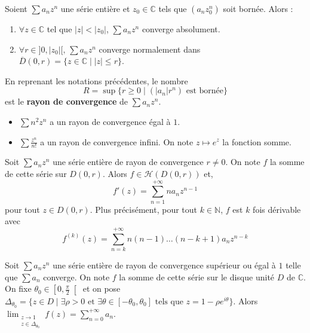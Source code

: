   \begin{lemma}
    Soient $\sum a_n z^n$ une série entière et $z_0 \in \mathbb{C}$ tels que $(a_n z_0^n)$ soit bornée. Alors :
    \begin{enumerate}[label={\bfseries(\roman*)}]
      \item $\forall z \in \mathbb{C}$ tel que $|z| < |z_0|$, $\sum a_n z^n$ converge absolument.
      \item $\forall r \in ]0,|z_0|[, \, \sum a_n z^n$ converge normalement dans $\overline{D}(0, r) = \{ z \in \mathbb{C} \mid |z| \leq r \}$.
    \end{enumerate}
  \end{lemma}

  \begin{definition}
    En reprenant les notations précédentes, le nombre
    \[ R = \sup \{ r \geq 0 \mid (|a_n|r^n) \text{ est bornée} \} \]
    est le \textbf{rayon de convergence} de $\sum a_n z^n$.
  \end{definition}


  \begin{example}
    \begin{itemize}
      \item $\sum n^2 z^n$ a un rayon de convergence égal à $1$.
      \item $\sum \frac{z^n}{n!}$ a un rayon de convergence infini. On note $z \mapsto e^z$ la fonction somme.
    \end{itemize}
  \end{example}


  \begin{proposition}
    Soit $\sum a_n z^n$ une série entière de rayon de convergence $r \neq 0$. On note $f$ la somme de cette série sur $D(0,r)$. Alors $f \in \mathcal{H}(D(0, r))$ et,
    \[ f'(z) = \sum_{n=1}^{+\infty} n a_n z^{n-1} \]
    pour tout $z \in D(0, r)$.
    \newpar
    Plus précisément, pour tout $k \in \mathbb{N}$, $f$ est $k$ fois dérivable avec
    \[ f^{(k)}(z) = \sum_{n=k}^{+\infty} n (n-1) \dots (n-k+1) a_n z^{n-k} \]
  \end{proposition}


  \begin{theorem}
    \label{241-2}
    Soit $\sum a_n z^n$ une série entière de rayon de convergence supérieur ou égal à $1$ telle que $\sum a_n$ converge. On note $f$ la somme de cette série sur le disque unité $D$ de $\mathbb{C}$. On fixe $\theta_0 \in \left[ 0, \frac{\pi}{2} \right[$ et on pose $\Delta_{\theta_0} = \{ z \in D \mid \exists \rho > 0 \text{ et } \exists \theta \in [-\theta_0, \theta_0] \text{ tels que } z = 1 - \rho e^{i\theta} \}$.
    \newpar
    Alors $\lim_{\substack{z \rightarrow 1 \\ z \in \Delta_{\theta_0}}} f(z) = \sum_{n=0}^{+\infty} a_n$.
  \end{theorem}


